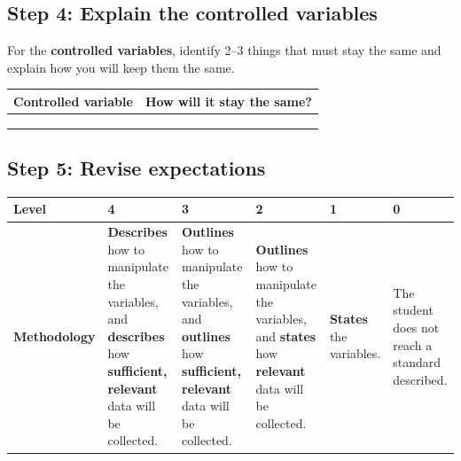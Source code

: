 \documentclass[12pt]{article}
\begin{document}
\subsection*{Step 4: Explain the controlled variables}

\begin{tcolorbox}[colback=white,colframe=black,title=What to include]
For the \textbf{controlled variables}, identify 2--3 things that must stay the same and explain how you will keep them the same.
\end{tcolorbox}

\begin{tabularx}{\textwidth}{|>{\raggedright\arraybackslash}p{}|X|}
\hline
\textbf{Controlled variable} & \textbf{How will it stay the same?} \\ \hline
 & \\[1.5cm] \hline
 & \\[1.5cm] \hline
 & \\[1.5cm] \hline
\end{tabularx}

\vfill

\subsection*{Step 5: Revise expectations}

\begin{center}
\begin{tabularx}{\textwidth}{|>{\raggedright\arraybackslash}X|
                               >{\raggedright\arraybackslash}X|
                               >{\raggedright\arraybackslash}X|
                               >{\raggedright\arraybackslash}X|
                               >{\raggedright\arraybackslash}X|
                               >{\raggedright\arraybackslash}X|}
\hline
\textbf{Level} & \textbf{4} & \textbf{3} & \textbf{2} & \textbf{1} & \textbf{0} \\ \hline

\textbf{Methodology}
& \textbf{Describes} how to manipulate the variables, and \textbf{describes} how \textbf{sufficient, relevant} data will be collected.
& \textbf{Outlines} how to manipulate the variables, and \textbf{outlines} how \textbf{sufficient, relevant} data will be collected.
& \textbf{Outlines} how to manipulate the variables, and \textbf{states} how \textbf{relevant} data will be collected.
& \textbf{States} the variables.
& The student does not reach a standard described. \\ \hline
\end{tabularx}
\end{center}
\end{document}
